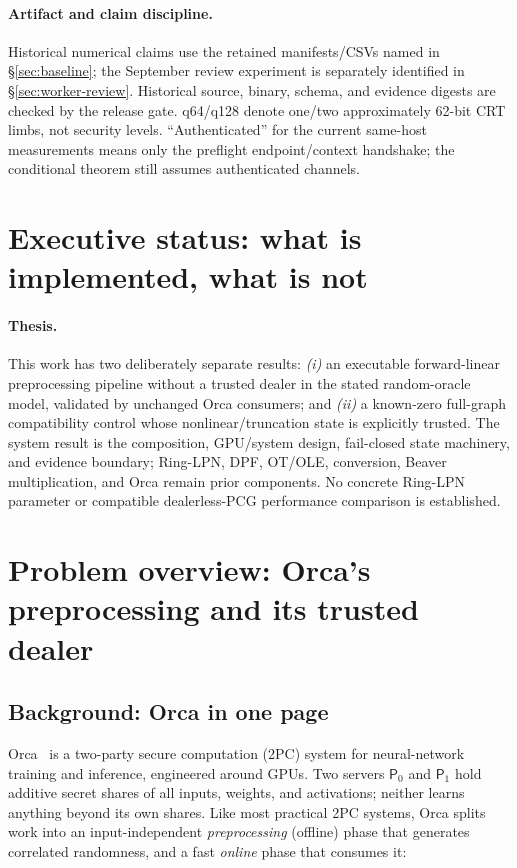 \documentclass[11pt]{article}
\newcommand{\ServerZero}{\mathsf{P}_0}
\newcommand{\ServerOne}{\mathsf{P}_1}
\begin{document}
\paragraph{Artifact and claim discipline.}
Historical numerical claims use the retained manifests/CSVs named in
\S\ref{sec:baseline}; the September review experiment is separately identified
in \S\ref{sec:worker-review}. Historical source, binary, schema, and evidence digests are checked by
the release gate. q64/q128 denote one/two approximately 62-bit CRT limbs, not
security levels. ``Authenticated'' for the current same-host measurements means
only the preflight endpoint/context handshake; the conditional theorem still
assumes authenticated channels.

\section{Executive status: what is implemented, what is not}

\paragraph{Thesis.}
This work has two deliberately separate results:
\emph{(i)} an executable forward-linear preprocessing pipeline without a
trusted dealer in the stated random-oracle model, validated by unchanged Orca
consumers; and \emph{(ii)} a known-zero full-graph compatibility control whose
nonlinear/truncation state is explicitly trusted. The system result is the
composition, GPU/system design, fail-closed state machinery, and evidence
boundary; Ring-LPN, DPF, OT/OLE, conversion, Beaver multiplication, and Orca
remain prior components. No concrete Ring-LPN parameter or compatible
dealerless-PCG performance comparison is established.

\section{Problem overview: Orca's preprocessing and its trusted dealer}
\label{sec:problem}

\subsection{Background: Orca in one page}
\label{sec:orca}

Orca~\cite{jawalkar2024orca} is a two-party secure computation (2PC) system
for neural-network training and inference, engineered around GPUs. Two servers
$\ServerZero$ and $\ServerOne$ hold additive secret shares of all inputs,
weights, and activations; neither learns anything beyond its own shares.
Like most practical 2PC systems, Orca splits work into an input-independent
\emph{preprocessing} (offline) phase that generates correlated randomness, and
a fast \emph{online} phase that consumes it:
\end{document}
